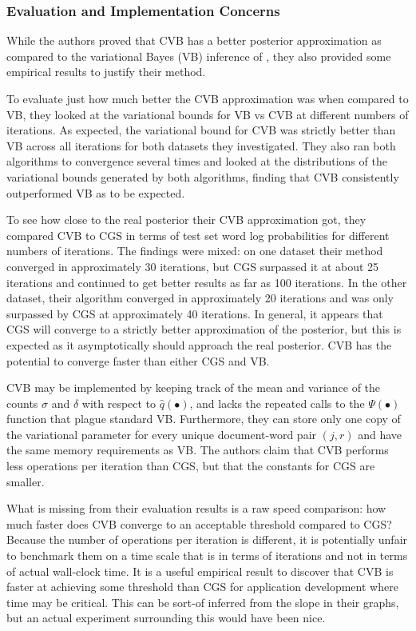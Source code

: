 \documentclass[11pt]{article}
\begin{document}
\subsubsection{Evaluation and Implementation Concerns}

While the authors proved that CVB has a better posterior approximation as
compared to the variational Bayes (VB) inference of \citet{Blei:2003:LDA},
they also provided some empirical results to justify their method.

To evaluate just how much better the CVB approximation was when
compared to VB, they looked at the variational bounds for VB vs CVB at
different numbers of iterations. As expected, the variational bound for CVB
was strictly better than VB across all iterations for both datasets they
investigated. They also ran both algorithms to convergence several times
and looked at the distributions of the variational bounds generated by both
algorithms, finding that CVB consistently outperformed VB as to be
expected.

To see how close to the real posterior their CVB approximation got, they
compared CVB to CGS in terms of test set word log probabilities for
different numbers of iterations. The findings were mixed: on one dataset
their method converged in approximately 30 iterations, but CGS surpassed it
at about 25 iterations and continued to get better results as far as 100
iterations. In the other dataset, their algorithm converged in
approximately 20 iterations and was only surpassed by CGS at approximately
40 iterations. In general, it appears that CGS will converge to a strictly
better approximation of the posterior, but this is expected as it
asymptotically should approach the real posterior. CVB has the potential to
converge faster than either CGS and VB.

CVB may be implemented by keeping track of the mean and variance of the
counts $\sigma$ and $\delta$ with respect to $\hat{q}(\bullet)$, and lacks
the repeated calls to the $\Psi(\bullet)$ function that plague standard VB.
Furthermore, they can store only one copy of the variational parameter for
every unique document-word pair $(j,r)$ and have the same memory
requirements as VB. The authors claim that CVB performs less operations per
iteration than CGS, but that the constants for CGS are smaller.

What is missing from their evaluation results is a raw speed comparison:
how much faster does CVB converge to an acceptable threshold compared to
CGS? Because the number of operations per iteration is different, it is
potentially unfair to benchmark them on a time scale that is in terms of
iterations and not in terms of actual wall-clock time. It is a useful
empirical result to discover that CVB is faster at achieving some threshold
than CGS for application development where time may be critical.  This can
be sort-of inferred from the slope in their graphs, but an actual
experiment surrounding this would have been nice.
\end{document}
